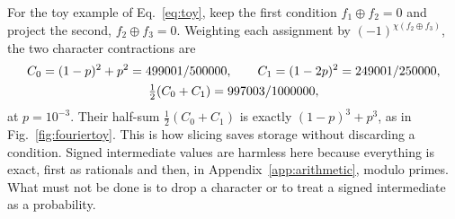 For the toy example of Eq.~\eqref{eq:toy}, keep the first condition $f_1\oplus f_2=0$ and project the second, $f_2\oplus f_3=0$. Weighting each assignment by $(-1)^{\chi(f_2\oplus f_3)}$, the two character contractions are
\[
\begin{gathered}
C_0=(1-p)^2+p^2=499001/500000,\qquad C_1=(1-2p)^2=249001/250000,\\
\tfrac12(C_0+C_1)=997003/1000000 ,
\end{gathered}
\]
at $p=10^{-3}$. Their half-sum $\tfrac12(C_0+C_1)$ is exactly $(1-p)^3+p^3$, as in Fig.~\ref{fig:fouriertoy}. This is how slicing saves storage without discarding a condition. Signed intermediate values are harmless here because everything is exact, first as rationals and then, in Appendix~\ref{app:arithmetic}, modulo primes. What must not be done is to drop a character or to treat a signed intermediate as a probability.
{\color{black}
}
